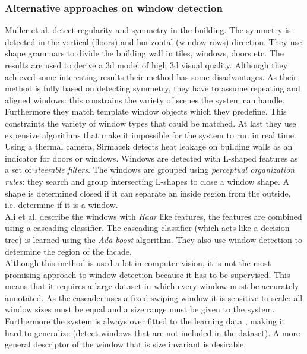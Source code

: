\subsubsection{Alternative approaches on window detection}
Muller et al. \cite{Muller_procedural} detect regularity and symmetry in the building. The
symmetry is detected in the vertical (floors) and horizontal (window
rows) direction.
They use shape grammars to divide the building wall in tiles, windows, doors etc.
The results are used to derive a 3d model of high 3d visual quality.
Although they achieved some interesting results their method has some
disadvantages.  As their method is fully based on detecting symmetry, they have
to assume repeating and aligned windows: this constrains the variety of scenes
the system can handle.
Furthermore they match template window objects which they predefine. This 
constraints the variety of window types that could be matched.  At last 
they use expensive algorithms that make it impossible for the system
to run in real time.  \\

Using a thermal camera, Sirmacek \cite{Sirmacek_thermal}
detects heat leakage on building walls as an indicator for doors or windows.
Windows are detected with L-shaped features as a set of \emph{steerable filters}.
The windows are grouped using \emph{perceptual organization rules}:
they search and group intersecting L-shapes to close a window shape. A shape is
determined closed if it can separate an inside region from the outside, i.e.
determine if it is a window.  \\

Ali et al. \cite{Ali_facades} describe the windows with \emph{Haar} like
features, the features are combined using a cascading classifier. The cascading
classifier (which acts like a decision tree) is learned using the \emph{Ada
boost} algorithm.  They also use window detection to determine the region of
the facade.\\

Although this method is used a lot in computer vision, it is not the most
promising approach to window detection because it has to be supervised.  This means
that it requires a large dataset in which every window must be accurately
annotated.  As the cascader uses a fixed swiping window it is sensitive to
scale: all window sizes must be equal and a size range must be given to the system.
Furthermore the system is always over fitted to the learning data
, making it hard to generalize (detect windows that are
not included in the dataset).  A more general descriptor of the window that is
size invariant is desirable.\\

